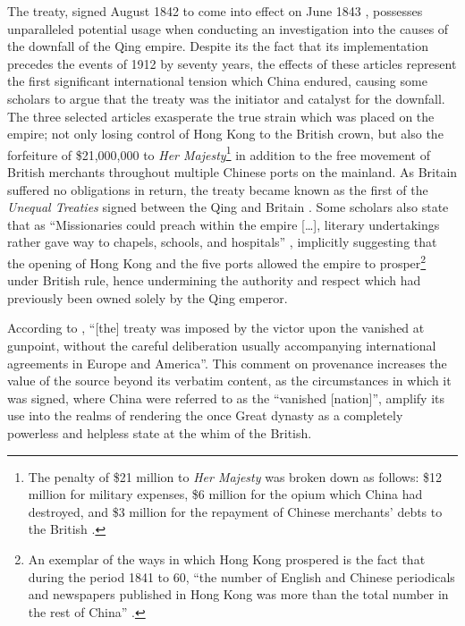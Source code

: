 \documentclass[a4paper,oneside]{article}
\begin{document}
        The treaty, signed  August 1842 to come into effect on  June 1843 \autocite{Saw:1975}, possesses unparalleled potential usage when conducting an investigation into the causes of the downfall of the Qing empire. Despite its the fact that its implementation precedes the events of 1912 by seventy years, the effects of these articles represent the first significant international tension which China endured, causing some scholars to argue that the treaty was the initiator and catalyst for the downfall. The three selected articles exasperate the true strain which was placed on the empire; not only losing control of Hong Kong to the British crown, but also the forfeiture of \$21,000,000 to \textit{Her Majesty}\footnote{The penalty of \$21 million to \textit{Her Majesty} was broken down as follows: \$12 million for military expenses, \$6 million for the opium which China had destroyed, and \$3 million for the repayment of Chinese merchants' debts to the British \autocite{Hsu:1999}.} in addition to the free movement of British merchants throughout multiple Chinese ports on the mainland. As Britain suffered no obligations in return, the treaty became known as the first of the \textit{Unequal Treaties} signed between the Qing and Britain \autocite{Hoe:1999}. Some scholars also state that as ``Missionaries could preach within the empire [\ldots], literary undertakings rather gave way to chapels, schools, and hospitals'' \autocite{Britton:1933}, implicitly suggesting that the opening of Hong Kong and the five ports allowed the empire to prosper\footnote{An exemplar of the ways in which Hong Kong prospered is the fact that during the period 1841 to 60, ``the number of English and Chinese periodicals and newspapers published in Hong Kong was more than the total number in the rest of China'' \autocite{Huang:2001}.} under British rule, hence undermining the authority and respect which had previously been owned solely by the Qing emperor.

        According to \autocite{Hsu:1999}, ``[the] treaty was imposed by the victor upon the vanished at gunpoint, without the careful deliberation usually accompanying international agreements in Europe and America''. This comment on provenance increases the value of the source beyond its verbatim content, as the circumstances in which it was signed, where China were referred to as the ``vanished [nation]'', amplify its use into the realms of rendering the once Great dynasty as a completely powerless and helpless state at the whim of the British.
\end{document}
